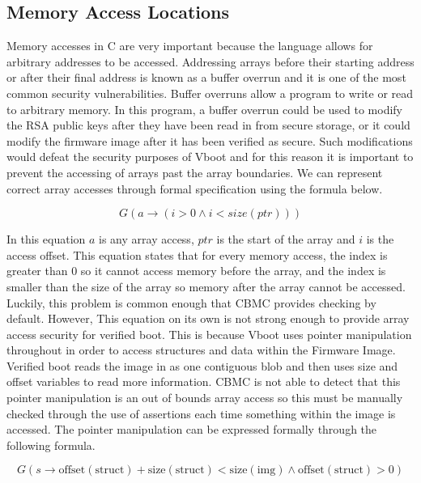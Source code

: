 \subsection{Memory Access Locations}

Memory accesses in C are very important because the language allows for arbitrary addresses to be accessed. 
Addressing arrays before their starting address or after their final address is known as a buffer overrun and it is one of the most common security vulnerabilities. 
Buffer overruns allow a program to write or read to arbitrary memory. 
In this program, a buffer overrun could be used to modify the RSA public keys after they have been read in from secure storage, or it could modify the firmware image after it has been verified as secure. 
Such modifications would defeat the security purposes of Vboot and for this reason it is important to prevent the accessing of arrays past the array boundaries.
We can represent correct array accesses through formal specification using the formula below.

\begin{equation}
    G(a \to (i > 0 \land i < size(ptr)))
\end{equation}

In this equation $a$ is any array access, $ptr$ is the start of the array and $i$ is the access offset.
This equation states that for every memory access, the index is greater than 0 so it cannot access memory before the array,  and the index is smaller than the size of the array so memory after the array cannot be accessed.
Luckily, this problem is common enough that CBMC provides checking by default.
However, This equation on its own is not strong enough to provide array access security for verified boot. 
This is because Vboot uses pointer manipulation throughout in order to access structures and data within the Firmware Image. 
Verified boot reads the image in as one contiguous blob and then uses size and offset variables to read more information.
CBMC is not able to detect that this pointer manipulation is an out of bounds array access so this must be manually checked through the use of assertions each time something within the image is accessed.
The pointer manipulation can be expressed formally through the following formula.

\begin{equation}
    G(s \to \text{offset}(\text{struct}) + \text{size}(\text{struct}) <
    \text{size}(\text{img}) \land \text{offset}(\text{struct}) > 0)
\end{equation}

